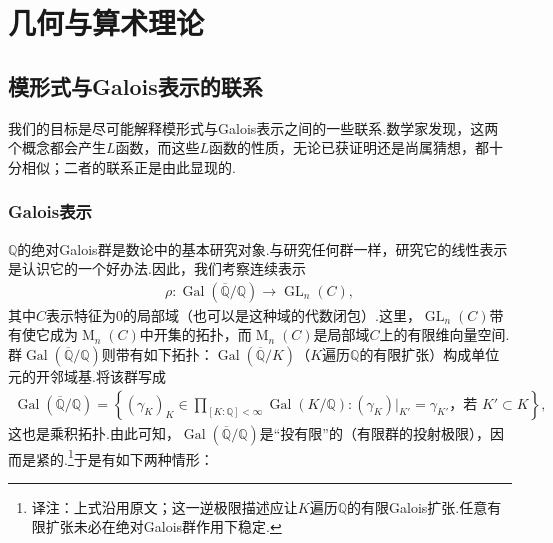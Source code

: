 
\chapter{几何与算术理论}\label{chap:modular-2}

\section{模形式与Galois表示的联系}\label{sec:modular-2-1}

我们的目标是尽可能解释模形式与Galois表示之间的一些联系.数学家发现，这两个概念都会产生$L$函数，而这些$L$函数的性质，无论已获证明还是尚属猜想，都十分相似；二者的联系正是由此显现的.



\subsection{Galois表示}\label{sec:modular-2-1-1}

$\mathbb Q$的绝对Galois群是数论中的基本研究对象.与研究任何群一样，研究它的线性表示是认识它的一个好办法.因此，我们考察连续表示
\begin{align*}
\rho:\operatorname{Gal}(\overline{\mathbb Q}/\mathbb Q)\longrightarrow\operatorname{GL}_n(C),
\end{align*}
其中$C$表示特征为$0$的局部域（也可以是这种域的代数闭包）.这里，$\operatorname{GL}_n(C)$带有使它成为$\operatorname M_n(C)$中开集的拓扑，而$\operatorname M_n(C)$是局部域$C$上的有限维向量空间.群$\operatorname{Gal}(\overline{\mathbb Q}/\mathbb Q)$则带有如下拓扑：$\operatorname{Gal}(\overline{\mathbb Q}/K)$（$K$遍历$\mathbb Q$的有限扩张）构成单位元的开邻域基.将该群写成
\begin{align*}
\operatorname{Gal}(\overline{\mathbb Q}/\mathbb Q)
=\left\{(\gamma_K)_K\in\prod_{[K:\mathbb Q]<\infty}\operatorname{Gal}(K/\mathbb Q):
 (\gamma_K)|_{K'}=\gamma_{K'}\text{，若 }K'\subset K\right\},
\end{align*}
这也是乘积拓扑.由此可知，$\operatorname{Gal}(\overline{\mathbb Q}/\mathbb Q)$是``投有限''的（有限群的投射极限），因而是紧的.\footnote{译注：上式沿用原文；这一逆极限描述应让$K$遍历$\mathbb Q$的有限Galois扩张.任意有限扩张未必在绝对Galois群作用下稳定.}于是有如下两种情形：

